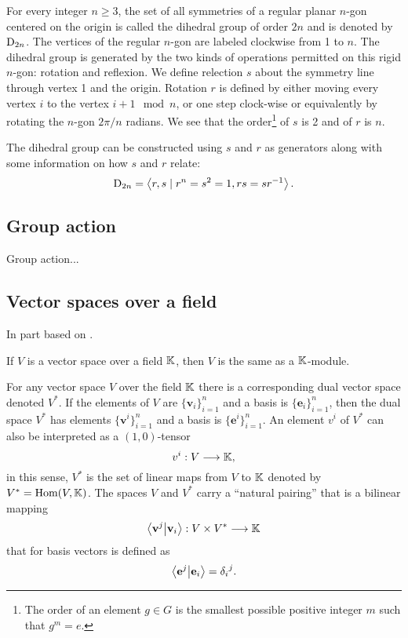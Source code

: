 	\begin{definition}
		For every integer $n \geq 3$, the set of all symmetries of a regular planar $n$-gon centered on the origin is called the dihedral group of order $2n$ and is denoted by $\text{D}_{2n}$. The vertices of the regular $n$-gon are labeled clockwise from 1 to $n$. The dihedral group is generated by the two kinds of operations permitted on this rigid $n$-gon: rotation and reflexion. We define relection $s$ about the symmetry line through vertex 1 and the origin. Rotation $r$ is defined by either moving every vertex $i$ to the vertex $i+1 \mod n$, or one step clock-wise or equivalently by rotating the $n$-gon $2 \pi /n$ radians. We see that the order\footnote{The order of an element $g \in G$ is the smallest possible positive integer $m$ such that $g^m = e$.} of $s$ is 2 and of $r$ is $n$.
		
		The dihedral group can be constructed using $s$ and $r$ as generators along with some information on how $s$ and $r$ relate:
		$$ \text{D}_{2n} = \left\langle r, s \mid r^n = s^2 = 1, rs = sr^{-1} \right\rangle.$$
	\end{definition}
	
	\subsection{Group action}
	
	\begin{definition}
		Group action...
	\end{definition}
	
	
	\subsection{Vector spaces over a field}
	
	In part based on \cite{Jeevanjee}.
	
	\begin{remark}[Modules]
		If $V$ is a vector space over a field $\mathbb{K}$, then $V$ is the same as a $\mathbb{K}$-module.
	\end{remark}
	
	\begin{definition}
		For any vector space $V$ over the field $\mathbb{K}$ there is a corresponding dual vector space denoted $V^*$. If the elements of $V$ are $\{\mathbf{v}_i\}_{i=1}^n$ and a basis is $\{\mathbf{e}_i\}_{i=1}^n$, then the dual space $V^*$ has elements $\{\mathbf{v}^i\}_{i=1}^n$ and a basis is $\{\mathbf{e}^i\}_{i=1}^n$. An element $v^i$ of $V^*$ can also be interpreted as a $(1,0)$-tensor
		\[
		v^i: V \longrightarrow \mathbb{K},
		\]
		in this sense, $V^*$ is the set of linear maps from $V$ to $\mathbb{K}$ denoted by $V^* = \text{Hom}(V,\mathbb{K})$.
		The spaces $V$ and $V^*$ carry a ``natural pairing'' that is a bilinear mapping
		\[
		\bra{\mathbf{v}^j}\ket{\mathbf{v}_i}: V \times V^* \longrightarrow \mathbb{K}
		\]
		that for basis vectors is defined as
		\[
		\bra{\mathbf{e}^j}\ket{\mathbf{e}_i} = {\delta_i}^j.
		\]
	\end{definition}
	
